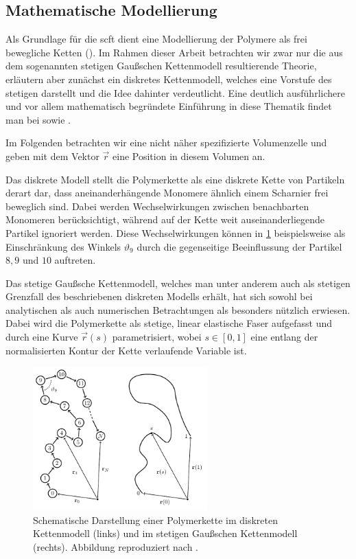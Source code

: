 \documentclass[../main.tex]{subfiles}
\begin{document}
\subsection*{Mathematische Modellierung} %

Als Grundlage für die \acl{scft} dient eine Modellierung der Polymere als frei bewegliche Ketten ().
Im Rahmen dieser Arbeit betrachten wir zwar nur die aus dem sogenannten stetigen Gaußschen Kettenmodell resultierende Theorie, erläutern aber zunächst ein diskretes Kettenmodell, welches eine Vorstufe des stetigen darstellt und die Idee dahinter verdeutlicht.
Eine deutlich ausführlichere und vor allem mathematisch begründete Einführung in diese Thematik findet man bei \textcites[Chapter 2]{Fredrickson:2006th} sowie \textcite{rubinstein2003polymer}.

Im Folgenden betrachten wir eine nicht näher spezifizierte Volumenzelle und geben mit dem Vektor $\vec{r}$ eine Position in diesem Volumen an.

Das diskrete Modell stellt die Polymerkette als eine diskrete Kette von Partikeln derart dar, dass aneinanderhängende Monomere ähnlich einem Scharnier frei beweglich sind.
Dabei werden Wechselwirkungen zwischen benachbarten Monomeren berücksichtigt, während auf der Kette weit auseinanderliegende Partikel ignoriert werden.
Diese Wechselwirkungen können in \cref{figure:kettenmodelle} beispielsweise als Einschränkung des Winkels $\vartheta_9$ durch die gegenseitige Beeinflussung der Partikel $8, 9$ und $10$ auftreten.

Das stetige Gaußsche Kettenmodell, welches man unter anderem auch als stetigen Grenzfall des beschriebenen diskreten Modells erhält, hat sich sowohl bei analytischen als auch numerischen Betrachtungen als besonders nützlich erwiesen.
Dabei wird die Polymerkette als stetige, linear elastische Faser aufgefasst und durch eine Kurve $\vec{r}(s)$ parametrisiert, wobei $s \in [0, 1]$ eine entlang der normalisierten Kontur der Kette verlaufende Variable ist.

\begin{figure}[tb]
    \centering
        \includegraphics[width=0.6\textwidth]{figures/einleitung/chainmodell.pdf}
    \caption[%
        Polymerkette in diskretem und Gaußschen Kettenmodell
    ]{%
        Schematische Darstellung einer Polymerkette im diskreten Kettenmodell (links) und im stetigen Gaußschen Kettenmodell (rechts).
        Abbildung reproduziert nach \cite[Figure 2.1 und 2.5]{Fredrickson:2006th}.
    }
    \label{figure:kettenmodelle}
\end{figure}
\end{document}

